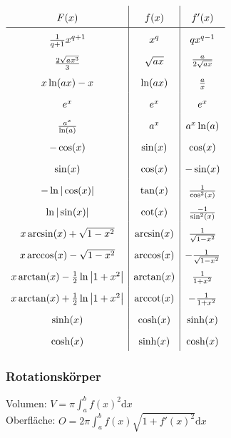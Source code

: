 \documentclass[6pt,a4paper]{scrartcl}
\DeclareMathOperator{\arccot}{arccot}
\begin{document}
\begin{multicols*}{4}
\everymath{\displaystyle}	%
\begin{math}\renewcommand{\arraystretch}{1.8}
\begin{array}{c|c|c}
F(x) & f(x) & f'(x) \\ \hline
\frac{1}{q+1}x^{q+1} & x^q & qx^{q-1} \\
\raisebox{-0.2em}{$\frac{2\sqrt{ax^3}}{3}$} & \sqrt{ax} & \raisebox{0.2em}{$\frac{a}{2\sqrt{ax}}$}\\
x\ln(ax) -x & \ln(ax) & \textstyle \frac{a}{x}\\
e^x & e^x & e^x \\
\frac{a^x}{\ln(a)} & a^x & a^x \ln(a) \\
-\cos(x) & \sin(x) & \cos(x)\\
\sin(x) & \cos(x) & -\sin(x)\\
-\ln |\cos(x)| & \tan(x) & \frac{1}{\cos^2(x)} \\
\ln |\sin(x)| & \cot(x) & \frac{-1}{\sin^2(x)} \\
x\arcsin (x)+\sqrt{1-x^2} & \arcsin(x) & \frac{1}{\sqrt{1-x^2}}\\
x\arccos (x)-\sqrt{1-x^2} & \arccos(x) & -\frac{1}{\sqrt{1-x^2}}\\
x\arctan (x)-\frac{1}{2} \ln \left| 1+ x^2 \right| & \arctan (x) & \frac{1}{1+x^2} \\
x\arctan (x)+\frac{1}{2} \ln \left| 1+ x^2 \right| & \arccot (x) & -\frac{1}{1+x^2} \\
\sinh(x) & \cosh(x) & \sinh (x) \\
\cosh(x) & \sinh(x) & \cosh (x)\\
\end{array}
\end{math}
\everymath{\textstyle}


\subsubsection{Rotationskörper}
Volumen: $V = \pi \int_a^b f(x)^2 \mathrm dx$\\
Oberfläche: $O = 2 \pi \int_a^b f(x) \sqrt{1 + f'(x)^2} \mathrm dx$


\end{multicols*}
\end{document}
